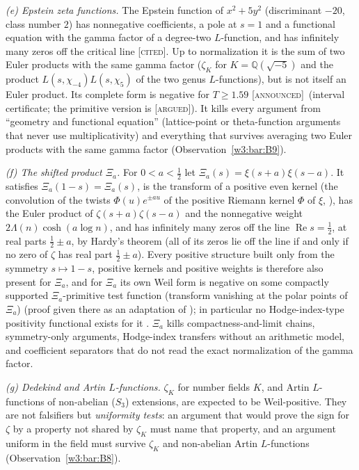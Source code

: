\documentclass[11pt]{amsart}
\theoremstyle{definition}
\theoremstyle{remark}
\numberwithin{equation}{section}
\newcommand{\Q}{\mathbb{Q}}
\DeclareMathOperator{\Rel}{Re}
\newcommand{\stag}[1]{\textsc{[#1]}}
\newcommand{\CITED}{\stag{cited}}
\newcommand{\ARGUED}{\stag{argued}}
\newcommand{\ANNOUNCED}{\stag{announced}}
\newcommand{\entry}[1]{\par\smallskip\noindent\textit{#1.}\enspace}
\begin{document}
\entry{(e) Epstein zeta functions} The Epstein function of $x^2+5y^2$ (discriminant $-20$, class number $2$)
has nonnegative coefficients, a pole at $s=1$ and a functional equation with the gamma factor of a degree-two
$L$-function, and has infinitely many zeros off the critical line \cite{DavenportHeilbronn1936} \CITED. Up to
normalization it is the sum of two Euler products with the same gamma factor ($\zeta_K$ for
$K=\Q(\sqrt{-5})$ and the product $L(s,\chi_{-4})L(s,\chi_5)$ of the two genus $L$-functions), but is not
itself an Euler product. Its
complete form is negative for $T\ge1.59$ \ANNOUNCED\ (interval certificate; the primitive version is \ARGUED).
It kills every argument from ``geometry and functional equation'' (lattice-point or theta-function arguments
that never use multiplicativity) and everything that survives averaging two Euler products with the same
gamma factor (Observation~\ref{w3:bar:B9}).

\entry{(f) The shifted product $\Xi_a$} For $0<a<\frac12$ let $\Xi_a(s)=\xi(s+a)\xi(s-a)$. It satisfies
$\Xi_a(1-s)=\Xi_a(s)$, is the transform of a positive even kernel (the convolution of the twists $\Phi(u)e^{\pm au}$ of the positive Riemann kernel $\Phi$ of $\xi$, \cite[\S10.1]{Titchmarsh1986}), has the Euler product of
$\zeta(s+a)\zeta(s-a)$ and the nonnegative weight $2\Lambda(n)\cosh(a\log n)$, and has infinitely many zeros off the line
$\Rel s=\frac12$, at real parts $\frac12\pm a$, by Hardy's theorem (all of its zeros lie off the line if and only if no zero of $\zeta$ has real part $\frac12\pm a$). Every positive structure built only from the
symmetry $s\mapsto1-s$, positive kernels and positive weights is therefore also present for $\Xi_a$, and for
$\Xi_a$ its own Weil form is negative on some compactly supported $\Xi_a$-primitive test function (transform
vanishing at the polar points of $\Xi_a$) \cite[Proposition~9.3]{P47}
(proof given there as an adaptation of \cite[Theorem~6.2]{P45}); in particular no Hodge-index-type positivity
functional exists for it \cite[Theorem~9.4]{P47}. $\Xi_a$ kills compactness-and-limit chains, symmetry-only
arguments, Hodge-index transfers without an arithmetic model, and coefficient separators that do not read the
exact normalization of the gamma factor.

\entry{(g) Dedekind and Artin $L$-functions} $\zeta_K$ for number fields $K$, and Artin $L$-functions of
non-abelian ($S_3$) extensions, are expected to be Weil-positive. They are not falsifiers but \emph{uniformity
tests}: an argument that would prove the sign for $\zeta$ by a property not shared by $\zeta_K$ must name that
property, and an argument uniform in the field must survive $\zeta_K$ and non-abelian Artin $L$-functions
(Observation~\ref{w3:bar:B8}).
\end{document}
